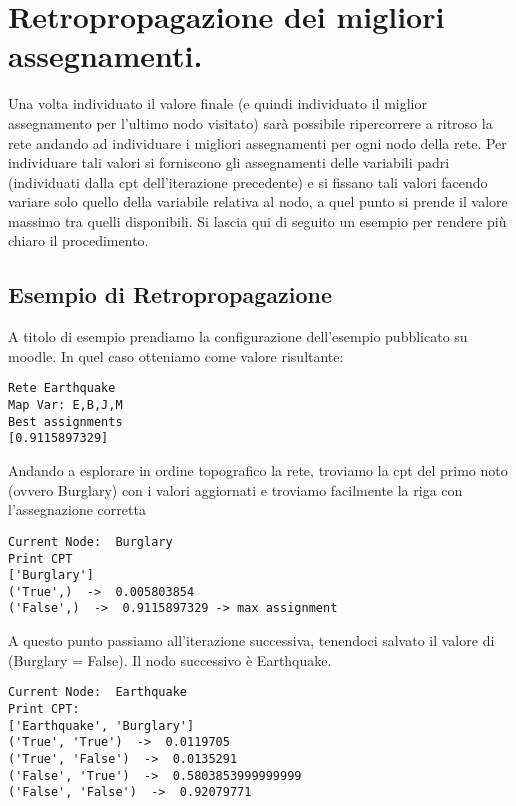 \section{Retropropagazione dei migliori assegnamenti.}
Una volta individuato il valore finale (e quindi individuato il miglior assegnamento per l’ultimo nodo visitato) sarà possibile ripercorrere a ritroso la rete andando ad individuare i migliori assegnamenti per ogni nodo della rete. Per individuare tali valori si forniscono gli assegnamenti delle variabili padri (individuati dalla cpt dell’iterazione precedente) e si fissano tali valori facendo variare solo quello della variabile relativa al nodo, a quel punto si prende il valore massimo tra quelli disponibili. Si lascia qui di seguito un esempio per rendere più chiaro il procedimento.


\subsection{Esempio di Retropropagazione}\label{retropropagazione}
A titolo di esempio prendiamo la configurazione dell’esempio pubblicato su moodle. In quel caso otteniamo come valore risultante:

\lstset{language=Octave,basicstyle=\ttfamily}
\begin{lstlisting}[frame=single]
Rete Earthquake
Map Var: E,B,J,M
Best assignments
[0.9115897329]
\end{lstlisting}

Andando a esplorare in ordine topografico la rete, troviamo la cpt del primo noto (ovvero Burglary) con i valori aggiornati e troviamo facilmente la riga con l’assegnazione corretta

\lstset{language=Octave,basicstyle=\ttfamily}
\begin{lstlisting}[frame=single]
Current Node:  Burglary
Print CPT
['Burglary']
('True',)  ->  0.005803854
('False',)  ->  0.9115897329 -> max assignment
\end{lstlisting}

A questo punto passiamo all’iterazione successiva, tenendoci salvato il valore di (Burglary = False). Il nodo successivo è Earthquake.

\lstset{language=Octave,basicstyle=\ttfamily}
\begin{lstlisting}[frame=single]
Current Node:  Earthquake
Print CPT: 
['Earthquake', 'Burglary']
('True', 'True')  ->  0.0119705
('True', 'False')  ->  0.0135291 
('False', 'True')  ->  0.5803853999999999
('False', 'False')  ->  0.92079771 
\end{lstlisting}

